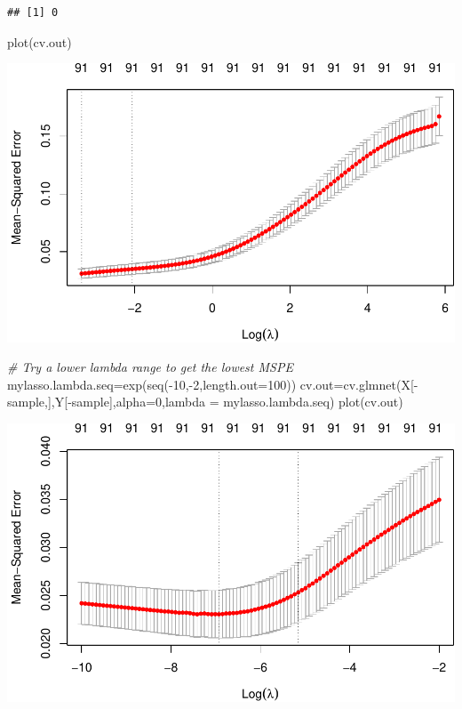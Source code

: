 \documentclass[
]{article}
\newenvironment{Shaded}{\begin{snugshade}}{\end{snugshade}}
\newcommand{\AttributeTok}[1]{\textcolor[rgb]{0.77,0.63,0.00}{#1}}
\newcommand{\CommentTok}[1]{\textcolor[rgb]{0.56,0.35,0.01}{\textit{#1}}}
\newcommand{\DecValTok}[1]{\textcolor[rgb]{0.00,0.00,0.81}{#1}}
\newcommand{\FunctionTok}[1]{\textcolor[rgb]{0.00,0.00,0.00}{#1}}
\newcommand{\NormalTok}[1]{#1}
\newcommand{\OtherTok}[1]{\textcolor[rgb]{0.56,0.35,0.01}{#1}}
\newcommand{\SpecialCharTok}[1]{\textcolor[rgb]{0.00,0.00,0.00}{#1}}
\begin{document}
\begin{verbatim}
## [1] 0
\end{verbatim}

\begin{Shaded}
\begin{Highlighting}[]
\FunctionTok{plot}\NormalTok{(cv.out)}
\end{Highlighting}
\end{Shaded}

\includegraphics{542_assign2_2_files/figure-latex/unnamed-chunk-5-1.pdf}

\begin{Shaded}
\begin{Highlighting}[]
\CommentTok{\# Try a lower lambda range to get the lowest MSPE}
\NormalTok{mylasso.lambda.seq}\OtherTok{=}\FunctionTok{exp}\NormalTok{(}\FunctionTok{seq}\NormalTok{(}\SpecialCharTok{{-}}\DecValTok{10}\NormalTok{,}\SpecialCharTok{{-}}\DecValTok{2}\NormalTok{,}\AttributeTok{length.out=}\DecValTok{100}\NormalTok{))}
\NormalTok{cv.out}\OtherTok{=}\FunctionTok{cv.glmnet}\NormalTok{(X[}\SpecialCharTok{{-}}\NormalTok{sample,],Y[}\SpecialCharTok{{-}}\NormalTok{sample],}\AttributeTok{alpha=}\DecValTok{0}\NormalTok{,}\AttributeTok{lambda =}\NormalTok{ mylasso.lambda.seq) }
\FunctionTok{plot}\NormalTok{(cv.out)   }
\end{Highlighting}
\end{Shaded}

\includegraphics{542_assign2_2_files/figure-latex/unnamed-chunk-5-2.pdf}
\end{document}
